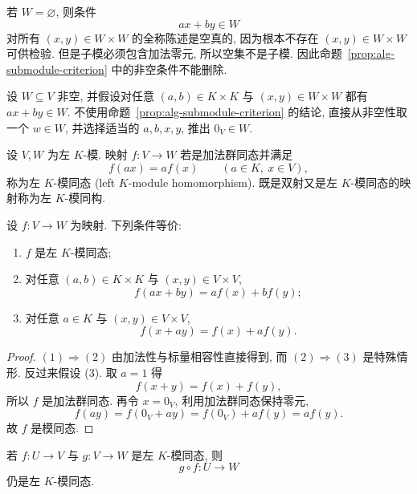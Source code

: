 \documentclass[usesamecnt, thmcnt=section, lang=cn, newtx, 10pt, scheme=chinese]{elegantbook}
\begin{document}
\begin{instance}
若 $W=\varnothing$, 则条件
\[
 ax+by\in W
\]
对所有 $(x,y)\in W\times W$ 的全称陈述是空真的, 因为根本不存在 $(x,y)\in W\times W$ 可供检验. 但是子模必须包含加法零元, 所以空集不是子模. 因此命题~\ref{prop:alg-submodule-criterion} 中的非空条件不能删除.
\end{instance}

\begin{exercise}\label{ex:alg-submodule-nonempty}
设 $W\subseteq V$ 非空, 并假设对任意 $(a,b)\in K\times K$ 与 $(x,y)\in W\times W$ 都有 $ax+by\in W$. 不使用命题~\ref{prop:alg-submodule-criterion} 的结论, 直接从非空性取一个 $w\in W$, 并选择适当的 $a,b,x,y$, 推出 $0_V\in W$.
\end{exercise}

\begin{definition}[模同态]\label{def:alg-module-hom}
设 $V,W$ 为左 $K$-模. 映射 $f:V\to W$ 若是加法群同态并满足
\[
 f(ax)=af(x)
 \qquad(a\in K,\ x\in V),
\]
称为{\color{blue}左 $K$-模同态 (left $K$-module homomorphism)}. 既是双射又是左 $K$-模同态的映射称为左 $K$-模同构.
\end{definition}

\begin{proposition}\label{prop:alg-module-hom-criterion}
设 $f:V\to W$ 为映射. 下列条件等价:
\begin{enumerate}[label=\rm(\arabic*)]
  \item $f$ 是左 $K$-模同态;
  \item 对任意 $(a,b)\in K\times K$ 与 $(x,y)\in V\times V$,
  \[
   f(ax+by)=af(x)+bf(y);
  \]
  \item 对任意 $a\in K$ 与 $(x,y)\in V\times V$,
  \[
   f(x+ay)=f(x)+af(y).
  \]
\end{enumerate}
\end{proposition}

\begin{proof}
$(1)\Rightarrow(2)$ 由加法性与标量相容性直接得到, 而 $(2)\Rightarrow(3)$ 是特殊情形. 反过来假设 (3). 取 $a=1$ 得
\[
 f(x+y)=f(x)+f(y),
\]
所以 $f$ 是加法群同态. 再令 $x=0_V$, 利用加法群同态保持零元,
\[
 f(ay)=f(0_V+ay)=f(0_V)+af(y)=af(y).
\]
故 $f$ 是模同态.
\end{proof}

\begin{proposition}\label{prop:alg-module-hom-composition}
若 $f:U\to V$ 与 $g:V\to W$ 是左 $K$-模同态, 则
\[
 g\circ f:U\to W
\]
仍是左 $K$-模同态.
\end{proposition}
\end{document}
